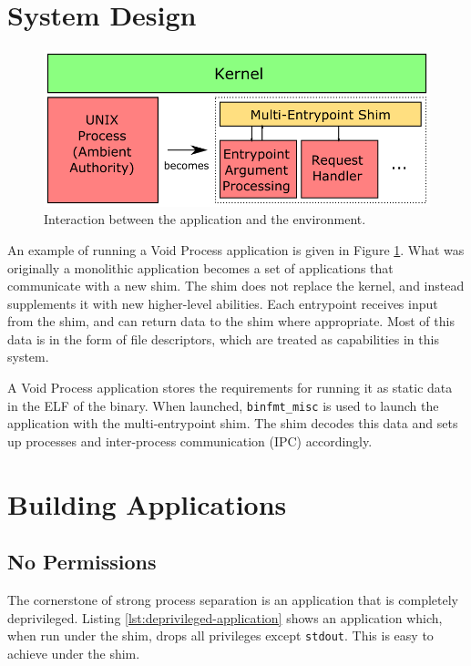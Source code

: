 \documentclass[sigplan]{acmart}
\begin{document}
\section{System Design}

\begin{figure}
    \centering
    \includegraphics[width=\columnwidth]{figures/self-compartmentalisation-interactions.png}
    \caption{Interaction between the application and the environment.}
    \label{fig:self-compartmentalisation-interactions}
\end{figure}

An example of running a Void Process application is given in Figure \ref{fig:self-compartmentalisation-interactions}. What was originally a monolithic application becomes a set of applications that communicate with a new shim. The shim does not replace the kernel, and instead supplements it with new higher-level abilities. Each entrypoint receives input from the shim, and can return data to the shim where appropriate. Most of this data is in the form of file descriptors, which are treated as capabilities in this system.

A Void Process application stores the requirements for running it as static data in the ELF of the binary. When launched, \texttt{binfmt\_misc} is used to launch the application with the multi-entrypoint shim. The shim decodes this data and sets up processes and inter-process communication (IPC) accordingly.


\section{Building Applications}

\subsection{No Permissions}

The cornerstone of strong process separation is an application that is completely deprivileged. Listing \ref{lst:deprivileged-application} shows an application which, when run under the shim, drops all privileges except \texttt{stdout}. This is easy to achieve under the shim.
\end{document}
